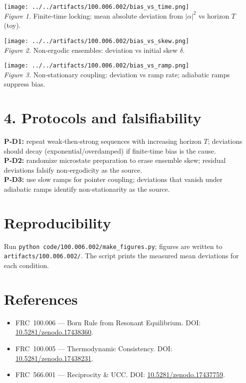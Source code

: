 \documentclass[10pt]{article}
\begin{document}
\begin{center}
\texttt{[image: ../../artifacts/100.006.002/bias\_vs\_time.png]}\\
\emph{Figure 1.} Finite‑time locking: mean absolute deviation from $|\alpha|^2$ vs horizon $T$ (toy).
\end{center}

\begin{center}
\texttt{[image: ../../artifacts/100.006.002/bias\_vs\_skew.png]}\\
\emph{Figure 2.} Non‑ergodic ensembles: deviation vs initial skew $\delta$.
\end{center}

\begin{center}
\texttt{[image: ../../artifacts/100.006.002/bias\_vs\_ramp.png]}\\
\emph{Figure 3.} Non‑stationary coupling: deviation vs ramp rate; adiabatic ramps suppress bias.
\end{center}

\section*{4. Protocols and falsifiability}
\textbf{P‑D1:} repeat weak‑then‑strong sequences with increasing horizon $T$; deviations should decay (exponential/overdamped) if finite‑time bias is the cause.\\
\textbf{P‑D2:} randomize microstate preparation to erase ensemble skew; residual deviations falsify non‑ergodicity as the source.\\
\textbf{P‑D3:} use slow ramps for pointer coupling; deviations that vanish under adiabatic ramps identify non‑stationarity as the source.

\section*{Reproducibility}
Run \verb|python code/100.006.002/make_figures.py|; figures are written to \verb|artifacts/100.006.002/|. The script prints the measured mean deviations for each condition.

\section*{References}
\small
\begin{itemize}
  \item FRC~100.006 — Born Rule from Resonant Equilibrium. DOI: \href{https://doi.org/10.5281/zenodo.17438360}{10.5281/zenodo.17438360}.
  \item FRC~100.005 — Thermodynamic Consistency. DOI: \href{https://doi.org/10.5281/zenodo.17438231}{10.5281/zenodo.17438231}.
  \item FRC~566.001 — Reciprocity \& UCC. DOI: \href{https://doi.org/10.5281/zenodo.17437759}{10.5281/zenodo.17437759}.
\end{itemize}
\end{document}
